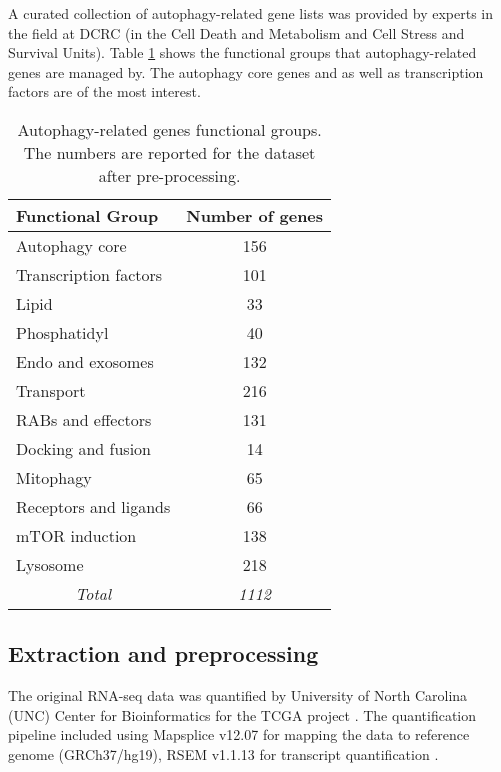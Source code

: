         
    A curated collection of autophagy-related gene lists was provided by experts in the field at DCRC (in the Cell Death and Metabolism and Cell Stress and Survival Units). Table \ref{table:autophagy} shows the functional groups that autophagy-related genes are managed by. The autophagy core genes and as well as transcription factors are of the most interest. 
    
    
            \begin{table}[!htbp]
            \centering
            \caption{Autophagy-related genes functional groups. The numbers are reported for the dataset after pre-processing.}
            \label{table:autophagy}
            \begin{tabular}{l|c}
            \small
            \textbf{Functional Group} & \multicolumn{1}{l}{\textbf{Number of genes}} \\ \hline
            Autophagy core & 156 \\ \hline
            Transcription factors & 101 \\ \hline
            Lipid & 33 \\ \hline
            Phosphatidyl & 40 \\ \hline
            Endo and exosomes & 132 \\ \hline
            Transport & 216 \\ \hline
            RABs and effectors & 131 \\ \hline
            Docking and fusion & 14 \\ \hline
            Mitophagy & 65 \\ \hline
            Receptors and ligands & 66 \\ \hline
            mTOR induction & 138 \\ \hline
            Lysosome & 218 \\ \hline
            \multicolumn{1}{c|}{\textit{Total}} & \textit{1112}
            \end{tabular}
            \end{table}
            
            
    \subsection{Extraction and preprocessing}
    

    
    The original RNA-seq data was quantified by University of North Carolina (UNC) Center for Bioinformatics for the TCGA project \cite{UniversityofNorthCarolinaUNCCenterforBioinfromatics2013TCGAData}. The quantification pipeline included  using Mapsplice v12.07 \cite{wang2010mapsplice} for mapping the data to reference genome (GRCh37/hg19), RSEM v1.1.13 \cite{li2011rsem} for transcript quantification \cite{UniversityofNorthCarolinaUNCCenterforBioinfromatics2013TCGAData}. 

